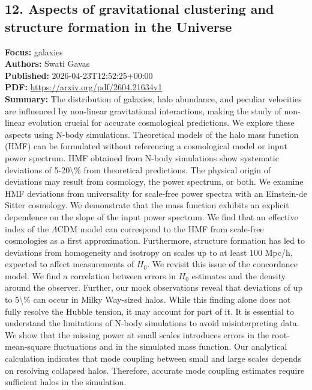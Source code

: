 \documentclass[11pt]{article}
\begin{document}
\subsection*{12. Aspects of gravitational clustering and structure formation in the Universe}
\textbf{Focus:} galaxies\\
\textbf{Authors:} Swati Gavas\\
\textbf{Published:} 2026-04-23T12:52:25+00:00\\
\textbf{PDF:} \href{https://arxiv.org/pdf/2604.21634v1}{https://arxiv.org/pdf/2604.21634v1}\\
\textbf{Summary:}
The distribution of galaxies, halo abundance, and peculiar velocities are influenced by non-linear gravitational interactions, making the study of non-linear evolution crucial for accurate cosmological predictions. We explore these aspects using N-body simulations. Theoretical models of the halo mass function (HMF) can be formulated without referencing a cosmological model or input power spectrum. HMF obtained from N-body simulations show systematic deviations of 5-20\textbackslash{}\% from theoretical predictions. The physical origin of deviations may result from cosmology, the power spectrum, or both. We examine HMF deviations from universality for scale-free power spectra with an Einstein-de Sitter cosmology. We demonstrate that the mass function exhibits an explicit dependence on the slope of the input power spectrum. We find that an effective index of the $\Lambda $CDM model can correspond to the HMF from scale-free cosmologies as a first approximation. Furthermore, structure formation has led to deviations from homogeneity and isotropy on scales up to at least $100$ Mpc/h, expected to affect measurements of $H_0$. We revisit this issue of the concordance model. We find a correlation between errors in $H_0$ estimates and the density around the observer. Further, our mock observations reveal that deviations of up to 5\textbackslash{}\% can occur in Milky Way-sized halos. While this finding alone does not fully resolve the Hubble tension, it may account for part of it. It is essential to understand the limitations of N-body simulations to avoid misinterpreting data. We show that the missing power at small scales introduces errors in the root-mean-square fluctuations and in the simulated mass function. Our analytical calculation indicates that mode coupling between small and large scales depends on resolving collapsed halos. Therefore, accurate mode coupling estimates require sufficient halos in the simulation.
\newpage
\end{document}
